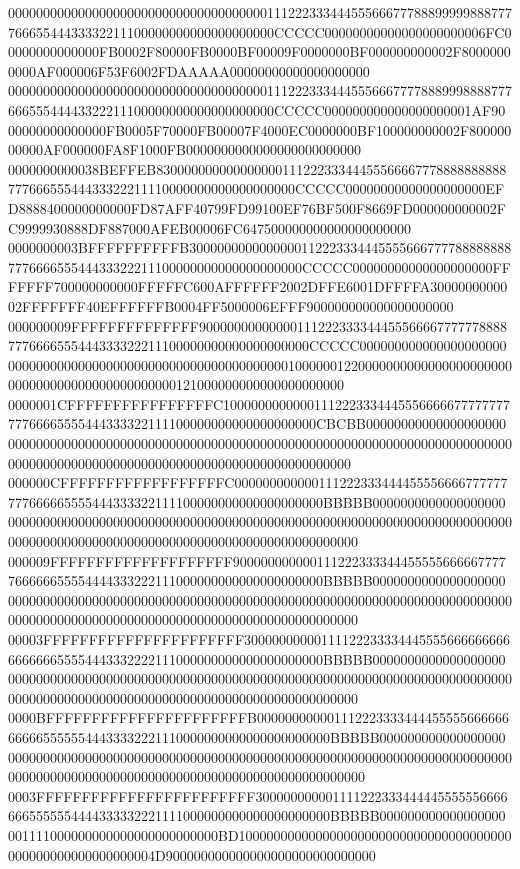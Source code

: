 00000000000000000000000000000000000001112223334445556667778889999988877776665544433332211100000000000000000000CCCCC00000000000000000000006FC00000000000000FB0002F80000FB0000BF00009F0000000BF000000000002F80000000000AF000006F53F6002FDAAAAA00000000000000000000
00000000000000000000000000000000000001112223334445556667777888999888877766655544443322211100000000000000000000CCCCC000000000000000000001AF9000000000000000FB0005F70000FB00007F4000EC0000000BF100000000002F80000000000AF000000FA8F1000FB0000000000000000000000000
0000000000038BEFFEB8300000000000000001112223334445556666777888888888877766655544433322211110000000000000000000CCCCC00000000000000000000EFD8888400000000000FD87AFF40799FD99100EF76BF500F8669FD000000000002FC9999930888DF887000AFEB00006FC647500000000000000000000
0000000003BFFFFFFFFFFB3000000000000000112223334445555666777788888888777666655544433322211100000000000000000000CCCCC00000000000000000000FFFFFFF700000000000FFFFFC600AFFFFFF2002DFFE6001DFFFFA3000000000002FFFFFFF40EFFFFFFB0004FF5000006EFFF900000000000000000000
000000009FFFFFFFFFFFFFF900000000000001112223333444555666677777788887776666555444333322211100000000000000000000CCCCC000000000000000000000000000000000000000000000000000000000000010000001220000000000000000000000000000000000000000000000121000000000000000000000
0000001CFFFFFFFFFFFFFFFFC1000000000000111222333444555666667777777777766665555444333322111100000000000000000000CBCBB000000000000000000000000000000000000000000000000000000000000000000000000000000000000000000000000000000000000000000000000000000000000000000000
000000CFFFFFFFFFFFFFFFFFFC000000000000111222333444455556666777777777666665555444333322111100000000000000000000BBBBB000000000000000000000000000000000000000000000000000000000000000000000000000000000000000000000000000000000000000000000000000000000000000000000
000009FFFFFFFFFFFFFFFFFFFF900000000000111222333344455555666667777766666655554444333222111000000000000000000000BBBBB000000000000000000000000000000000000000000000000000000000000000000000000000000000000000000000000000000000000000000000000000000000000000000000
00003FFFFFFFFFFFFFFFFFFFFFF30000000000111122233334445555666666666666666655554443332222111000000000000000000000BBBBB000000000000000000000000000000000000000000000000000000000000000000000000000000000000000000000000000000000000000000000000000000000000000000000
0000BFFFFFFFFFFFFFFFFFFFFFFB0000000000011122233334444555556666666666655555544433332221110000000000000000000000BBBBB000000000000000000000000000000000000000000000000000000000000000000000000000000000000000000000000000000000000000000000000000000000000000000000
0003FFFFFFFFFFFFFFFFFFFFFFFF3000000000011112223334444455555566666665555554444333332221111000000000000000000000BBBBB000000000000000000001111000000000000000000000000BD100000000000000000000000000000000000000000000000000000000004D900000000000000000000000000000
